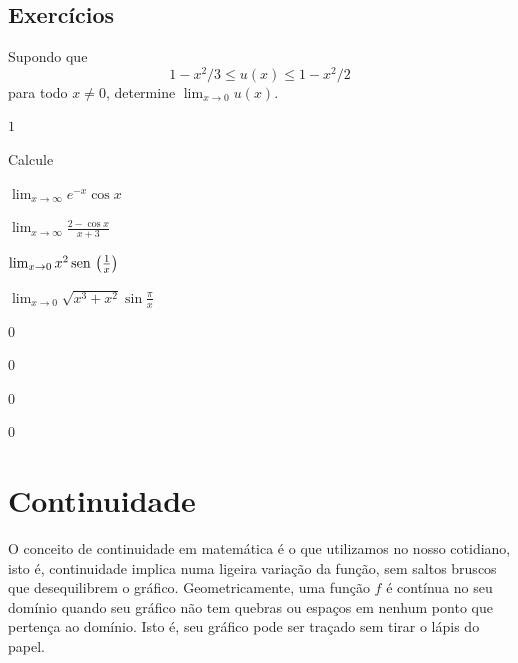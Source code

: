 \cleardoublepage\documentclass[../main.tex]{subfiles}
\begin{document}
\subsection{Exercícios}

\begin{exer}
  Supondo que $$1-x^2/3 \leq u(x) \leq 1-x^2/2$$ para todo $x\neq 0$, determine  $\lim_{x\to 0} u(x)$.
\end{exer}
\begin{resp}
  $1$
\end{resp}

\begin{exer}
  Calcule
  \begin{multicols}{2}
   \begin{compactenum}[a)]
  \item $ \lim_{x\to \infty} e^{-x}\cos x$\\
  \item $ \lim_{x\to \infty} \frac{2-\cos x}{x+3}$\\
  \item $\lim_{x\to 0} x^2\operatorname{sen}\,\left(\frac{1}{x}\right)$\\
  \item $\lim_{x\to 0} \sqrt{x^3+x^2}\sin\frac{\pi}{x}$
  \end{compactenum}
  \end{multicols}
 
  \end{exer}
\begin{resp}
\begin{multicols}{4}
\begin{compactenum}[a)]
\item $0$
\item  $0$
\item  $0$
\item $0$
\end{compactenum}
\end{multicols}
\end{resp}

\section{Continuidade}\hypertarget{Continuidade}{}\label{sec:Continuidade}
O conceito de continuidade em matemática é o que utilizamos no nosso cotidiano, isto é, continuidade implica numa ligeira variação da função, sem saltos bruscos que desequilibrem o gráfico. Geometricamente, uma função \(f\) é contínua no seu domínio quando seu gráfico não tem quebras ou espaços em nenhum ponto que pertença ao domínio. Isto é, seu gráfico pode ser traçado sem tirar o lápis do papel.
\end{document}
